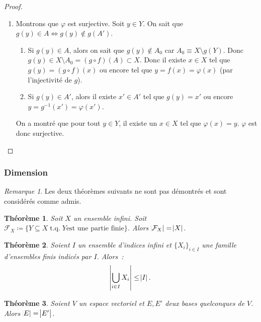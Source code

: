 \documentclass{article}
\DeclareMathOperator{\tq}{\text{ t.q. }}
\newtheorem{thm}{Théorème}[section]
\theoremstyle{definition}
\theoremstyle{remark}
\newtheorem*{rmq}{Remarque}
\begin{document}
\begin{proof}
\begin{enumerate}
			\item Montrons que $\varphi$ est surjective. Soit $y \in Y$. On sait que $g(y) \in A \iff g(y) \not \in g(A')$.
			\begin{enumerate}
				\item Si $g(y) \in A$, alors on sait que $g(y) \not \in A_0$ car $A_0 \equiv X \setminus g(Y)$. Donc $g(y) \in X \setminus A_0 = (g \circ f)(A) \subset X$.
				Donc il existe $x \in X$ tel que $g(y) = (g \circ f)(x)$ ou encore tel que $y = f(x) = \varphi(x)$ (par l'injectivité de $g$).
				\item Si $g(y) \in A'$, alors il existe $x' \in A'$ tel que $g(y) = x'$ ou encore $y = g^{-1}(x') = \varphi(x')$.
			\end{enumerate}
			On a montré que pour tout $y \in Y$, il existe un $x \in X$ tel que $\varphi(x) = y$. $\varphi$ est donc surjective.
		\end{enumerate}
		\end{proof}

		\subsubsection{Dimension}
		\begin{rmq} Les deux théorèmes suivants ne sont pas démontrés et sont considérés comme admis. \end{rmq}

		\begin{thm}\label{cardPartiesFinies} Soit $X$ un ensemble infini. Soit $\mathcal F_X \coloneqq \{Y \subseteq X \tq Y \text {est une partie finie}\}$.
		Alors $\abs {\mathcal F_X} = \abs X$. \end{thm}

		\begin{thm}\label{unionEnsFinisIndicésInfini} Soient $I$ un ensemble d'indices infini et $\{X_i\}_{i \in I}$ une famille d'ensembles finis indicés par $I$.
		Alors~: \[\abs {\bigcup_{i \in I}X_i} \leq \abs I.\] \end{thm}

		\begin{thm} Soient $V$ un espace vectoriel et $E, E'$ deux bases quelconques de $V$. Alors $\abs E = \abs {E'}$. \end{thm}
\end{document}
